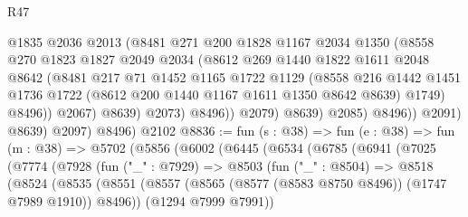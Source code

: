 \begin{lexlean}{R47}
\begin{coremodule}
                            @1835
                            @2036
                            @2013
                            (@8481
                              @271
                              @200
                              @1828
                              @1167
                              @2034
                              @1350
                              (@8558
                                @270
                                @1823
                                @1827
                                @2049
                                @2034
                                (@8612
                                  @269
                                  @1440
                                  @1822
                                  @1611
                                  @2048
                                  @8642
                                  (@8481
                                    @217
                                    @71
                                    @1452
                                    @1165
                                    @1722
                                    @1129
                                    (@8558
                                      @216
                                      @1442
                                      @1451
                                      @1736
                                      @1722
                                      (@8612 @200 @1440 @1167 @1611 @1350 @8642 @8639)
                                      @1749)
                                    @8496))
                                @2067)
                              @8639)
                            @2073)
                          @8496))
                      @2079)
                    @8639)
                  @2085)
                @8496))
            @2091)
          @8639)
        @2097)
      @8496)
    @2102
@8836 := fun (s : @38) =>
  fun (e : @38) =>
  fun (m : @38) =>
  @5702
    (@5856
      (@6002
        (@6445
          (@6534
            (@6785
              (@6941
                (@7025
                  (@7774
                    (@7928
                      (fun ("_" : @7929) =>
                      @8503
                        (fun ("_" : @8504) =>
                        @8518
                          (@8524
                            (@8535
                              (@8551
                                (@8557
                                  (@8565 (@8577 (@8583 @8750 @8496)) (@1747 @7989 @1910))
                                  @8496))
                              (@1294 @7999 @7991))

\end{coremodule}
\end{lexlean}
